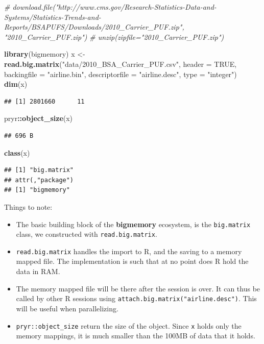 \documentclass[]{book}
\newenvironment{Shaded}{\begin{snugshade}}{\end{snugshade}}
\newcommand{\CommentTok}[1]{\textcolor[rgb]{0.56,0.35,0.01}{\textit{#1}}}
\newcommand{\DataTypeTok}[1]{\textcolor[rgb]{0.13,0.29,0.53}{#1}}
\newcommand{\KeywordTok}[1]{\textcolor[rgb]{0.13,0.29,0.53}{\textbf{#1}}}
\newcommand{\NormalTok}[1]{#1}
\newcommand{\OperatorTok}[1]{\textcolor[rgb]{0.81,0.36,0.00}{\textbf{#1}}}
\newcommand{\OtherTok}[1]{\textcolor[rgb]{0.56,0.35,0.01}{#1}}
\newcommand{\StringTok}[1]{\textcolor[rgb]{0.31,0.60,0.02}{#1}}
\providecommand{\tightlist}{%
  \setlength{\itemsep}{0pt}\setlength{\parskip}{0pt}}
\theoremstyle{definition}
\theoremstyle{definition}
\theoremstyle{definition}
\theoremstyle{remark}
\begin{document}
\begin{Shaded}
\begin{Highlighting}[]
\CommentTok{# download.file("http://www.cms.gov/Research-Statistics-Data-and-Systems/Statistics-Trends-and-Reports/BSAPUFS/Downloads/2010_Carrier_PUF.zip", "2010_Carrier_PUF.zip")}
\CommentTok{# unzip(zipfile="2010_Carrier_PUF.zip")}

\KeywordTok{library}\NormalTok{(bigmemory)}
\NormalTok{x <-}\StringTok{ }\KeywordTok{read.big.matrix}\NormalTok{(}\StringTok{"data/2010_BSA_Carrier_PUF.csv"}\NormalTok{, }\DataTypeTok{header =} \OtherTok{TRUE}\NormalTok{, }
                     \DataTypeTok{backingfile =} \StringTok{"airline.bin"}\NormalTok{, }
                     \DataTypeTok{descriptorfile =} \StringTok{"airline.desc"}\NormalTok{, }
                     \DataTypeTok{type =} \StringTok{"integer"}\NormalTok{)}
\KeywordTok{dim}\NormalTok{(x)}
\end{Highlighting}
\end{Shaded}

\begin{verbatim}
## [1] 2801660      11
\end{verbatim}

\begin{Shaded}
\begin{Highlighting}[]
\NormalTok{pryr}\OperatorTok{::}\KeywordTok{object_size}\NormalTok{(x)}
\end{Highlighting}
\end{Shaded}

\begin{verbatim}
## 696 B
\end{verbatim}

\begin{Shaded}
\begin{Highlighting}[]
\KeywordTok{class}\NormalTok{(x)}
\end{Highlighting}
\end{Shaded}

\begin{verbatim}
## [1] "big.matrix"
## attr(,"package")
## [1] "bigmemory"
\end{verbatim}

Things to note:

\begin{itemize}
\tightlist
\item
  The basic building block of the \textbf{bigmemory} ecosystem, is the \texttt{big.matrix} class, we constructed with \texttt{read.big.matrix}.
\item
  \texttt{read.big.matrix} handles the import to R, and the saving to a memory mapped file. The implementation is such that at no point does R hold the data in RAM.
\item
  The memory mapped file will be there after the session is over. It can thus be called by other R sessions using \texttt{attach.big.matrix("airline.desc")}. This will be useful when parallelizing.
\item
  \texttt{pryr::object\_size} return the size of the object. Since \texttt{x} holds only the memory mappings, it is much smaller than the 100MB of data that it holds.
\end{itemize}
\end{document}
